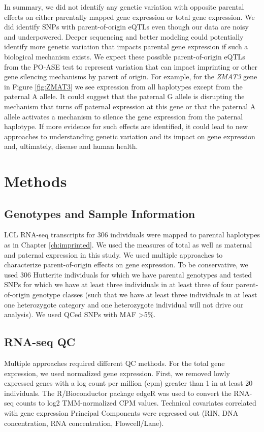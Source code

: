 In summary, we did not identify any genetic variation with opposite parental effects on either parentally mapped gene expression or total gene expression. We did identify SNPs with parent-of-origin eQTLs even though our data are noisy and underpowered. Deeper sequencing and better modeling could potentially identify more genetic variation that impacts parental gene expression if such a biological mechanism exists. We expect these possible parent-of-origin eQTLs from the PO-ASE test to represent variation that can impact imprinting or other gene silencing mechanisms by parent of origin. For example, for the \emph{ZMAT3} gene in Figure \ref{fig:ZMAT3} we see expression from all haplotypes except from the paternal A allele. It could suggest that the paternal G allele is disrupting the mechanism that turns off paternal expression at this gene or that the paternal A allele activates a mechanism to silence the gene expression from the paternal haplotype. If more evidence for such effects are identified, it could lead to new approaches to understanding genetic variation and its impact on gene expression and, ultimately, disease and human health. 

\section{Methods}\label{ch04-methods}

\subsection{Genotypes and Sample Information}\label{Genotypes and Sample Information}
LCL RNA-seq transcripts for 306 individuals were mapped to parental haplotypes as in Chapter \ref{ch:imprinted}. We used the measures of total as well as maternal and paternal expression in this study. We used multiple approaches to characterize parent-of-origin effects on gene expression. To be conservative, we used 306 Hutterite individuals for which we have parental genotypes and tested SNPs for which we have at least three individuals in at least three of four parent-of-origin genotype classes (such that we have at least three individuals in at least one heterozygote category and one heterozygote individual will not drive our analysis). We used QCed SNPs with MAF \textgreater 5\%.

\subsection{RNA-seq QC}\label{RNA-seq QC}
Multiple approaches required different QC methods. For the total gene expression, we used normalized gene expression. First, we removed lowly expressed genes with a log count per million (cpm) greater than 1 in at least 20 individuals. The R/Bioconductor package edgeR was used to convert the RNA-seq counts to log2 TMM-normalized CPM values\cite{Robinson:2010dd,Robinson:2010cw}. Technical covariates correlated with gene expression Principal Components were regressed out (RIN, DNA concentration, RNA concentration, Flowcell/Lane). 


